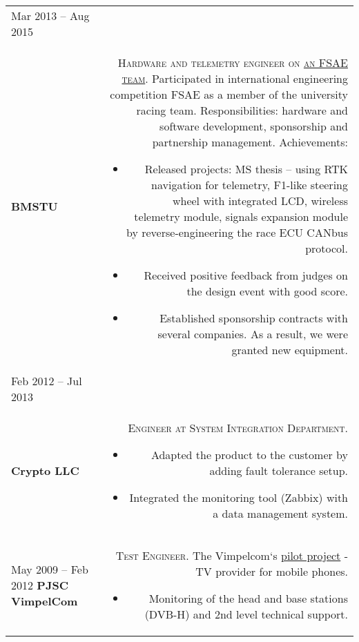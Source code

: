 \begin{tabular}{@{}L!{\VRule}R} 
    Mar 2013 -- Aug 2015                                                                                                       \\ {\bf BMSTU \\ } &
    {\textsc{Hardware and telemetry engineer on \href{https://baumanracing.ru/en/}{an FSAE team}.}}
    Participated in international engineering competition FSAE as a member of the university racing team.
    Responsibilities: hardware and software development, sponsorship and partnership management.
    Achievements:
    \begin{itemize}
        \item Released projects: MS thesis -- using RTK navigation for telemetry, F1-like steering wheel with integrated LCD, wireless telemetry module, signals expansion module by reverse-engineering the race ECU CANbus protocol.
        \item Received positive feedback from judges on the design event with good score.
        \item Established sponsorship contracts with several companies. As a result, we were granted new equipment.
    \end{itemize}                                                                                              \\
    Feb 2012 -- Jul 2013                                                                                                       \\ {\bf Crypto LLC \\ } &
    {\textsc{Engineer at System Integration Department.}}
    \begin{itemize}
        \item Adapted the product to the customer by adding fault tolerance setup.
        \item Integrated the monitoring tool (Zabbix) with a data management system.
    \end{itemize}                                                                                                  \\
    May 2009 -- Feb 2012 {\bf PJSC VimpelCom} &
    {\textsc{Test Engineer.}} The Vimpelcom`s \href{https://www.dvb.org/news/russia-to-launch-dvb-h-services}{pilot project} - TV provider for mobile phones.
    \begin{itemize}
        \item Monitoring of the head and base stations (DVB-H) and 2nd level technical support.
    \end{itemize}
\end{tabular}